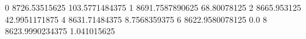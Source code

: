 0 8726.53515625 103.5771484375
1 8691.7587890625 68.80078125
2 8665.953125 42.9951171875
4 8631.71484375 8.7568359375
6 8622.9580078125 0.0
8 8623.9990234375 1.041015625
